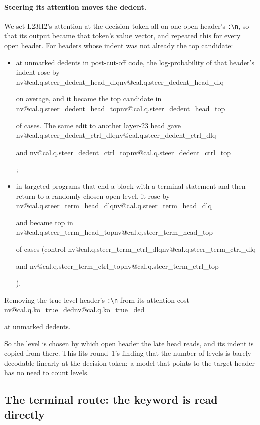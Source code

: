 \documentclass[11pt]{article}
\makeatletter
\newcommand{\nv}[1]{\ifcsname nv@#1\endcsname\csname nv@#1\endcsname\else\PackageError{numbers}{Unknown number key #1}{}\fi}
\newcommand{\hd}[2]{L#1H#2}
\newcommand{\code}[1]{\texttt{#1}}
\makeatother
\begin{document}
\paragraph{Steering its attention moves the dedent.} We set \hd{23}{2}'s attention at the decision token all-on one open header's \code{:\textbackslash n}, so that its output became that token's value vector, and repeated this for every open header. For headers whose indent was not already the top candidate:
\begin{itemize}
\item at unmarked dedents in post-cut-off code, the log-probability of that header's indent rose by \nv{cal.q.steer_dedent_head_dlq} on average, and it became the top candidate in \nv{cal.q.steer_dedent_head_top} of cases. The same edit to another layer-23 head gave \nv{cal.q.steer_dedent_ctrl_dlq} and \nv{cal.q.steer_dedent_ctrl_top};
\item in targeted programs that end a block with a terminal statement and then return to a randomly chosen open level, it rose by \nv{cal.q.steer_term_head_dlq} and became top in \nv{cal.q.steer_term_head_top} of cases (control \nv{cal.q.steer_term_ctrl_dlq} and \nv{cal.q.steer_term_ctrl_top}).
\end{itemize}
Removing the true-level header's \code{:\textbackslash n} from its attention cost \nv{cal.q.ko_true_ded} at unmarked dedents.

So the level is chosen by which open header the late head reads, and its indent is copied from there. This fits round~1's finding that the number of levels is barely decodable linearly at the decision token: a model that points to the target header has no need to count levels.

\subsection{The terminal route: the keyword is read directly}
\label{sec:kw}
\end{document}
